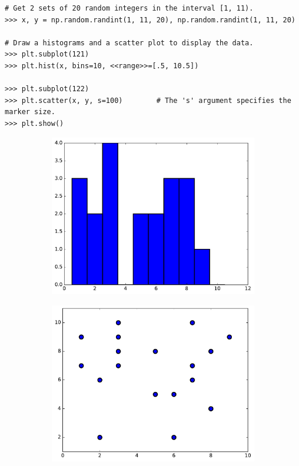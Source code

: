 \begin{lstlisting}
# Get 2 sets of 20 random integers in the interval [1, 11).
>>> x, y = np.random.randint(1, 11, 20), np.random.randint(1, 11, 20)

# Draw a histograms and a scatter plot to display the data.
>>> plt.subplot(121)
>>> plt.hist(x, bins=10, <<range>>=[.5, 10.5])

>>> plt.subplot(122)
>>> plt.scatter(x, y, s=100)        # The 's' argument specifies the marker size.
>>> plt.show()
\end{lstlisting}

\begin{figure}[H]
\captionsetup[subfigure]{justification=centering}
\centering
\begin{subfigure}{.49\textwidth}
    \centering
    \includegraphics[width=\linewidth]{figures/histogram.pdf}
    \label{fig:histogram}
\end{subfigure}
%
\begin{subfigure}{.49\textwidth}
    \centering
    \includegraphics[width=\linewidth]{figures/scatterplot.pdf}
\end{subfigure}
\end{figure}

